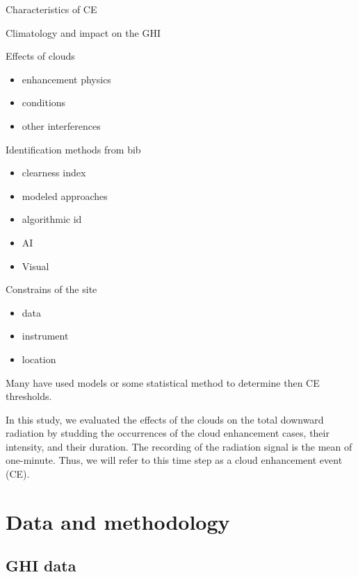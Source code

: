 \documentclass[
]{article}
\providecommand{\tightlist}{%
  \setlength{\itemsep}{0pt}\setlength{\parskip}{0pt}}
\begin{document}
Characteristics of CE

Climatology and impact on the GHI

Effects of clouds

\begin{itemize}
\tightlist
\item
  enhancement physics
\item
  conditions
\item
  other interferences
\end{itemize}

Identification methods from bib

\begin{itemize}
\tightlist
\item
  clearness index
\item
  modeled approaches
\item
  algorithmic id
\item
  AI
\item
  Visual
\end{itemize}

Constrains of the site

\begin{itemize}
\tightlist
\item
  data
\item
  instrument
\item
  location
\end{itemize}

Many have used models or some statistical method to determine then CE thresholds.

In this study, we evaluated the effects of the clouds on the total downward radiation
by studding the occurrences of the cloud enhancement cases, their intensity, and their
duration. The recording of the radiation signal is the mean of one-minute. Thus, we
will refer to this time step as a cloud enhancement event (CE).

\hypertarget{data-and-methodology}{%
\section{Data and methodology}\label{data-and-methodology}}

\hypertarget{ghi-data}{%
\subsection{GHI data}\label{ghi-data}}
\end{document}
